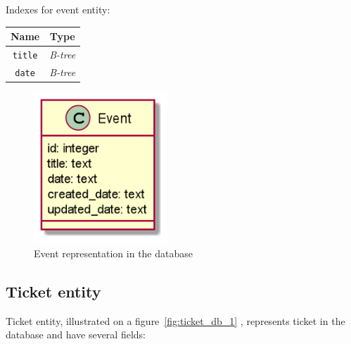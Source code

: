 Indexes for event entity:

\begin{center}
    \begin{tabular}{ | c | c | }
        \hline
        \textbf{Name}  & \textbf{Type}   \\ \hline
        \texttt{title}  & \textit{B-tree} \\ \hline
        \texttt{date} & \textit{B-tree} \\ \hline
    \end{tabular}
\end{center}

\begin{figure}[h]
    \centering
    \includegraphics[width=0.45\textwidth]{images/event}
    \caption{Event representation in the database}
    \label{fig:event_db_1}
\end{figure}

\subsection{Ticket entity}\label{subsec:ticket-entity}

Ticket entity, illustrated on a figure~\ref{fig:ticket_db_1} , represents ticket in the database and have several fields:


